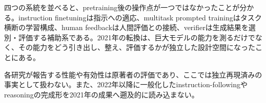 四つの系統を並べると、pretraining後の操作点が一つではなかったことが分かる。instruction finetuningは指示への適応、multitask prompted trainingはタスク横断の学習構成、human feedbackは人間評価との接続、verifierは生成結果を選別・評価する補助系である。2021年の転換は、巨大モデルの能力を測るだけでなく、その能力をどう引き出し、整え、評価するかが独立した設計空間になったことにある。\autocite{src-34f845c1e710,src-6339600396eb,src-750bc3eeb1bc,src-7f768525daf5,src-8b2f7c40f4a4,src-90a37f62aeab}


\begin{claimboundary}
各研究が報告する性能や有効性は原著者の評価であり、ここでは独立再現済みの事実として扱わない。また、2022年以降に一般化したinstruction-followingやreasoningの完成形を2021年の成果へ遡及的に読み込まない。\autocite{src-34f845c1e710,src-6339600396eb,src-750bc3eeb1bc,src-7f768525daf5,src-8b2f7c40f4a4,src-90a37f62aeab}
\end{claimboundary}
